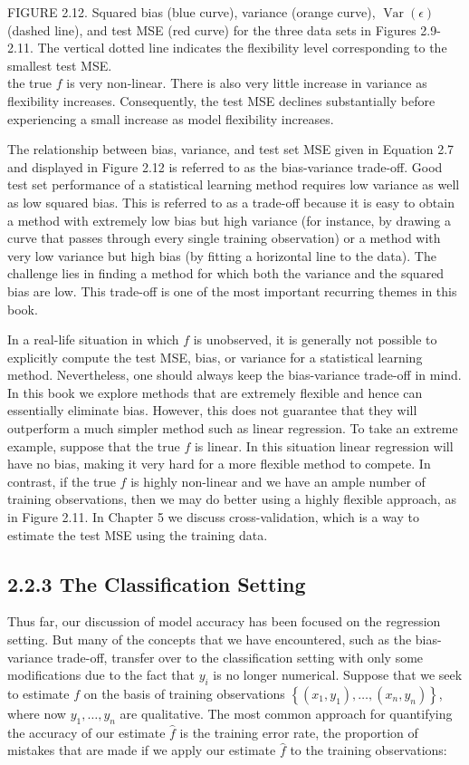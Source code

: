 \documentclass[10pt]{article}
\begin{document}
FIGURE 2.12. Squared bias (blue curve), variance (orange curve), $\operatorname{Var}(\epsilon)$ (dashed line), and test MSE (red curve) for the three data sets in Figures 2.9-2.11. The vertical dotted line indicates the flexibility level corresponding to the smallest test MSE.\\
the true $f$ is very non-linear. There is also very little increase in variance as flexibility increases. Consequently, the test MSE declines substantially before experiencing a small increase as model flexibility increases.

The relationship between bias, variance, and test set MSE given in Equation 2.7 and displayed in Figure 2.12 is referred to as the bias-variance trade-off. Good test set performance of a statistical learning method requires low variance as well as low squared bias. This is referred to as a trade-off because it is easy to obtain a method with extremely low bias but high variance (for instance, by drawing a curve that passes through every single training observation) or a method with very low variance but high bias (by fitting a horizontal line to the data). The challenge lies in finding a method for which both the variance and the squared bias are low. This trade-off is one of the most important recurring themes in this book.

In a real-life situation in which $f$ is unobserved, it is generally not possible to explicitly compute the test MSE, bias, or variance for a statistical learning method. Nevertheless, one should always keep the bias-variance trade-off in mind. In this book we explore methods that are extremely flexible and hence can essentially eliminate bias. However, this does not guarantee that they will outperform a much simpler method such as linear regression. To take an extreme example, suppose that the true $f$ is linear. In this situation linear regression will have no bias, making it very hard for a more flexible method to compete. In contrast, if the true $f$ is highly non-linear and we have an ample number of training observations, then we may do better using a highly flexible approach, as in Figure 2.11. In Chapter 5 we discuss cross-validation, which is a way to estimate the test MSE using the training data.


\subsection*{2.2.3 The Classification Setting}
Thus far, our discussion of model accuracy has been focused on the regression setting. But many of the concepts that we have encountered, such as the bias-variance trade-off, transfer over to the classification setting with only some modifications due to the fact that $y_{i}$ is no longer numerical. Suppose that we seek to estimate $f$ on the basis of training observations $\left\{\left(x_{1}, y_{1}\right), \ldots,\left(x_{n}, y_{n}\right)\right\}$, where now $y_{1}, \ldots, y_{n}$ are qualitative. The most common approach for quantifying the accuracy of our estimate $\hat{f}$ is the training error rate, the proportion of mistakes that are made if we apply our estimate $\hat{f}$ to the training observations:
\end{document}
